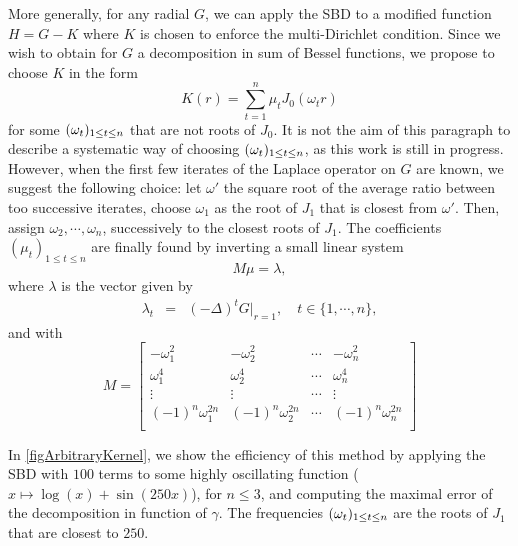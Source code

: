 \documentclass[smallextended]{svjour3}
\begin{document}
More generally, for any radial $G$, we can apply the SBD to a modified function $H = G - K$ where $K$ is chosen to enforce the multi-Dirichlet condition. Since we wish to obtain for $G$ a decomposition in sum of Bessel functions, we propose to choose $K$ in the form 
\[K(r) = \sum_{t=1}^{n} \mu_t J_0(\omega_t r)\]
for some $(\omega_{t})_{1 \leq t \leq n}$ that are not roots of $J_0$. It is not the aim of this paragraph to describe a systematic way of choosing $(\omega_{t})_{1 \leq t \leq n}$, as this work is still in progress. However, when the first few iterates of the Laplace operator on $G$ are known, we suggest the following choice: let $\omega'$ the square root of the average ratio between too successive iterates, choose $\omega_1$ as the root of $J_1$ that is closest from $\omega'$. Then, assign $\omega_2, \cdots, \omega_n$, successively to the closest roots of $J_1$. The coefficients $(\mu_t)_{1 \leq t \leq n}$ are finally found by inverting a small linear system 
\[M\mu = \lambda,\]
where $\lambda$ is the vector given by
\begin{eqnarray*}
	\lambda_t &=& (-\Delta)^t G \big|_{r=1}, \quad t\in \{1,\cdots,n\},
\end{eqnarray*}
and with
\[M=
	\begin{bmatrix}
		-\omega_1^2      & -\omega_2^2             & \cdots & -\omega_n^2  \\
			\omega_1^4   & \omega_2^4 		              & \cdots & \omega_n^4   \\
		\vdots      	& \vdots                              & \cdots & \vdots     \\
		(-1)^n \omega_1^{2n}      & (-1)^n \omega_2^{2n}  & \cdots &(-1)^n \omega_n^{2n} \\ 
	\end{bmatrix}
\]
\vspace{5pt}

In \autoref{figArbitraryKernel}, we show the efficiency of this method by applying the SBD with $100$ terms to some highly oscillating function ($x \mapsto \log(x) + \sin(250x)$), 
for $n \leq 3$, and computing the maximal error of the decomposition in function of $\gamma$. The frequencies $(\omega_{t})_{1 \leq t \leq n}$ are the roots of $J_1$ that are closest to $250$. 
										
\end{document}

